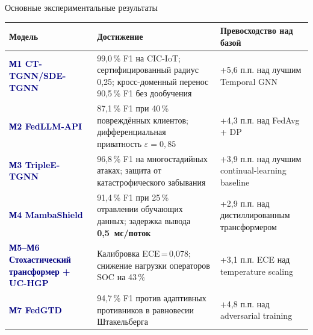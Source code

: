 \documentclass[10pt,aspectratio=169]{beamer}
\newcommand{\hl}[1]{\textcolor{accent}{\textbf{#1}}}
\newcommand{\bn}[1]{\textcolor{navy}{\textbf{#1}}}
\begin{document}
\begin{frame}{Основные экспериментальные результаты}
\footnotesize
\begin{tabular}{@{}p{4.0cm}p{5.4cm}p{4.8cm}@{}}
\toprule
\textbf{Модель} & \textbf{Достижение} & \textbf{Превосходство над базой} \\
\midrule
\bn{М1 CT-TGNN/SDE-TGNN} & 99{,}0\,\% F1 на CIC-IoT;
сертифицированный радиус 0{,}25; кросс-доменный перенос
90{,}5\,\% F1 без дообучения & +5{,}6 п.п. над лучшим Temporal GNN \\
\midrule
\bn{М2 FedLLM-API} & 87{,}1\,\% F1 при 40\,\% повреждённых
клиентов; дифференциальная приватность $\varepsilon=0{,}85$ &
+4{,}3 п.п. над FedAvg + DP \\
\midrule
\bn{М3 TripleE-TGNN} & 96{,}8\,\% F1 на многостадийных атаках;
защита от катастрофического забывания & +3{,}9 п.п. над
лучшим continual-learning baseline \\
\midrule
\bn{М4 MambaShield} & 91{,}4\,\% F1 при 25\,\% отравлении
обучающих данных; задержка вывода \hl{0{,}5~мс/поток} &
+2{,}9 п.п. над дистиллированным трансформером \\
\midrule
\bn{М5--М6 Стохастический трансформер + UC-HGP} & Калибровка
ECE\,=\,0{,}078; снижение нагрузки операторов SOC на 43\,\% &
+3{,}1 п.п. ECE над temperature scaling \\
\midrule
\bn{М7 FedGTD} & 94{,}7\,\% F1 против адаптивных противников
в равновесии Штакельберга & +4{,}8 п.п. над adversarial
training \\
\bottomrule
\end{tabular}
\end{frame}
\end{document}

